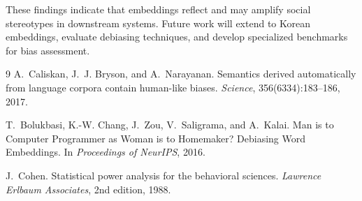 \documentclass[12pt,a4paper]{article}
\begin{document}
These findings indicate that embeddings reflect and may amplify social stereotypes in downstream systems. 
Future work will extend to Korean embeddings, evaluate debiasing techniques, 
and develop specialized benchmarks for bias assessment.

\begin{thebibliography}{9}
A.~Caliskan, J.~J. Bryson, and A.~Narayanan.
\newblock Semantics derived automatically from language corpora contain human-like biases.
\newblock \emph{Science}, 356(6334):183--186, 2017.

T.~Bolukbasi, K.-W. Chang, J.~Zou, V.~Saligrama, and A.~Kalai.
\newblock Man is to Computer Programmer as Woman is to Homemaker? Debiasing Word Embeddings.
\newblock In \emph{Proceedings of NeurIPS}, 2016.

J.~Cohen.
\newblock Statistical power analysis for the behavioral sciences.
\newblock \emph{Lawrence Erlbaum Associates}, 2nd edition, 1988.
\end{thebibliography}
\end{document}
